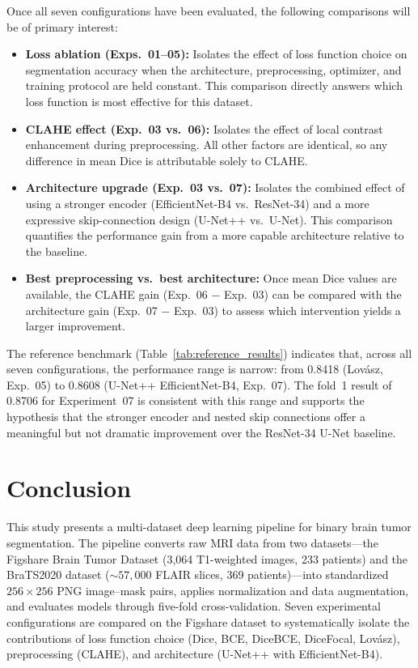 \documentclass[a4paper,12pt]{article}
\begin{document}
Once all seven configurations have been evaluated, the following comparisons will be of primary
interest:

\begin{itemize}
    \item \textbf{Loss ablation (Exps.\ 01--05):} Isolates the effect of loss function choice
          on segmentation accuracy when the architecture, preprocessing, optimizer, and training
          protocol are held constant. This comparison directly answers which loss function is
          most effective for this dataset.

    \item \textbf{CLAHE effect (Exp.\ 03 vs.\ 06):} Isolates the effect of local contrast
          enhancement during preprocessing. All other factors are identical, so any difference
          in mean Dice is attributable solely to CLAHE.

    \item \textbf{Architecture upgrade (Exp.\ 03 vs.\ 07):} Isolates the combined effect of
          using a stronger encoder (EfficientNet-B4 vs.\ ResNet-34) and a more expressive
          skip-connection design (U-Net++ vs.\ U-Net). This comparison quantifies the
          performance gain from a more capable architecture relative to the baseline.

    \item \textbf{Best preprocessing vs.\ best architecture:} Once mean Dice values are
          available, the CLAHE gain (Exp.\ 06 $-$ Exp.\ 03) can be compared with the
          architecture gain (Exp.\ 07 $-$ Exp.\ 03) to assess which intervention yields a
          larger improvement.
\end{itemize}

The reference benchmark (Table~\ref{tab:reference_results}) indicates that, across all seven
configurations, the performance range is narrow: from 0.8418 (Lovász, Exp.\ 05) to 0.8608
(U-Net++ EfficientNet-B4, Exp.\ 07). The fold~1 result of 0.8706 for Experiment~07
is consistent with this range and supports the hypothesis that the stronger encoder and nested
skip connections offer a meaningful but not dramatic improvement over the ResNet-34 U-Net
baseline.


\section{Conclusion}
\label{sec:conclusion}

This study presents a multi-dataset deep learning pipeline for binary brain tumor segmentation.
The pipeline converts raw MRI data from two datasets---the Figshare Brain Tumor Dataset
(3,064 T1-weighted images, 233 patients) and the BraTS2020 dataset (${\sim}57{,}000$ FLAIR
slices, 369 patients)---into standardized $256 \times 256$ PNG image--mask pairs, applies
normalization and data augmentation, and evaluates models through five-fold cross-validation.
Seven experimental configurations are compared on the Figshare dataset to systematically
isolate the contributions of loss function choice (Dice, BCE, DiceBCE, DiceFocal, Lovász),
preprocessing (CLAHE), and architecture (U-Net++ with EfficientNet-B4).
\end{document}
